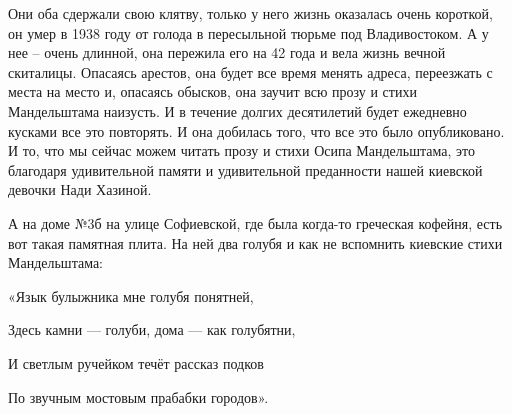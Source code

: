 Они оба сдержали свою клятву, только у него жизнь оказалась очень короткой, он
умер в 1938 году от голода в пересыльной тюрьме под Владивостоком. А у нее –
очень длинной, она пережила его на 42 года и вела жизнь вечной скиталицы.
Опасаясь арестов, она будет все время менять адреса, переезжать с места на
место и, опасаясь  обысков, она заучит всю  прозу и   стихи  Мандельштама
наизусть. И в течение долгих десятилетий будет ежедневно кусками все это
повторять. И она добилась того, что все это было опубликовано.  И то, что мы
сейчас можем читать прозу и стихи Осипа Мандельштама, это благодаря
удивительной памяти и удивительной преданности нашей киевской девочки Нади
Хазиной. 


А на доме №3б на улице Софиевской, где была когда-то греческая кофейня,  есть
вот такая памятная плита. На ней два голубя и как не вспомнить киевские стихи
Мандельштама: 

«Язык булыжника мне голубя понятней, 

Здесь камни — голуби, дома — как голубятни, 

И светлым ручейком течёт рассказ подков

По звучным мостовым прабабки городов».

